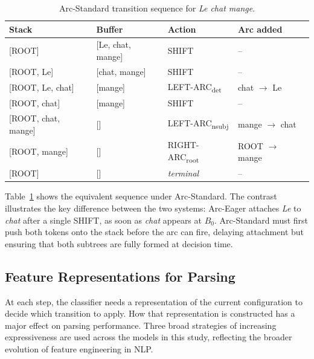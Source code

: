 \documentclass[12pt,letterpaper]{article}
\begin{document}
\begin{table}[ht]
\centering
\caption{Arc-Standard transition sequence for \textit{Le chat mange}.}
\label{tab:arc_standard_example}
\begin{tabular}{llll}
\hline
\textbf{Stack} & \textbf{Buffer} & \textbf{Action} & \textbf{Arc added} \\
\hline
{[ROOT]}             & [Le, chat, mange] & SHIFT                         & -- \\
{[ROOT, Le]}         & [chat, mange]     & SHIFT                         & -- \\
{[ROOT, Le, chat]}   & [mange]           & LEFT-ARC\textsubscript{det}   & chat $\rightarrow$ Le \\
{[ROOT, chat]}       & [mange]           & SHIFT                         & -- \\
{[ROOT, chat, mange]}& []                & LEFT-ARC\textsubscript{nsubj} & mange $\rightarrow$ chat \\
{[ROOT, mange]}      & []                & RIGHT-ARC\textsubscript{root} & ROOT $\rightarrow$ mange \\
{[ROOT]}             & []                & \textit{terminal}             & -- \\
\hline
\end{tabular}
\end{table}
\FloatBarrier
Table~\ref{tab:arc_standard_example} shows the equivalent sequence under 
Arc-Standard. The contrast illustrates the key difference between the two 
systems: Arc-Eager attaches \textit{Le} to \textit{chat} after a single 
SHIFT, as soon as \textit{chat} appears at $B_0$. Arc-Standard must first 
push both tokens onto the stack before the arc can fire, delaying attachment 
but ensuring that both subtrees are fully formed at decision time.


\subsection{Feature Representations for Parsing}
\label{subsec:feature_representations}

At each step, the classifier needs a representation of the current configuration to decide which transition to apply. How that representation is constructed has a major effect on parsing performance. Three broad strategies of increasing expressiveness are used across the models in this study, reflecting the broader evolution of feature engineering in NLP.
\end{document}
